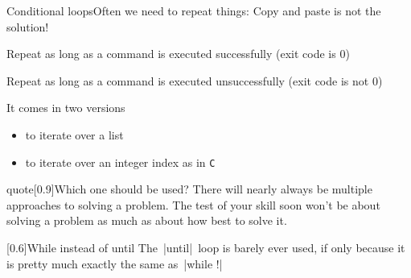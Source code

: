 
\begin{frame}{Conditional loops}{Often we need to repeat things: Copy and paste is not the solution!}
    \vspace{-3mm}
    \begin{description}
        \item[\texttt{while}] Repeat as long as a command is executed successfully (exit code is 0)
        \item[\texttt{until}] Repeat as long as a command is executed unsuccessfully (exit code is not 0)
        \item[\texttt{for}] It comes in two versions
                            \begin{itemize}
                                \item to iterate over a list
                                \item to iterate over an integer index as in \texttt{C}
                            \end{itemize}
    \end{description}
    \begin{varblock}{quote}[0.9\textwidth]{Which one should be used?}
        There will nearly always be multiple approaches to solving a problem.
        The test of your skill soon won't be about solving a problem as much as about how best to solve it.
    \end{varblock}
    \begin{varblock}{}[0.6\textwidth]{While instead of until}
        The \,\bash|until|\, loop is barely ever used, if only because it is pretty much exactly the same as \,\bash|while !|
    \end{varblock}
\end{frame}
